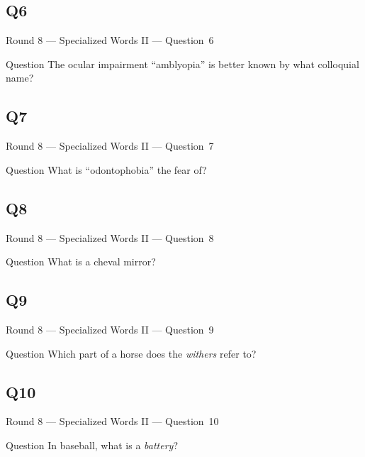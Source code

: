 \documentclass[11pt]{beamer}
\begin{document}
\subsection*{Q6}
\begin{frame}[t]{Round 8 --- Specialized Words II --- \mbox{Question 6}}
    \vspace{-0.5em}
    \begin{block}{Question}
        The ocular impairment ``amblyopia'' is better known by what colloquial name?
    \end{block}
\end{frame}
\subsection*{Q7}
\begin{frame}[t]{Round 8 --- Specialized Words II --- \mbox{Question 7}}
    \vspace{-0.5em}
    \begin{block}{Question}
        What is ``odontophobia'' the fear of?
    \end{block}
\end{frame}
\subsection*{Q8}
\begin{frame}[t]{Round 8 --- Specialized Words II --- \mbox{Question 8}}
    \vspace{-0.5em}
    \begin{block}{Question}
        What is a cheval mirror?
    \end{block}
\end{frame}
\subsection*{Q9}
\begin{frame}[t]{Round 8 --- Specialized Words II --- \mbox{Question 9}}
    \vspace{-0.5em}
    \begin{block}{Question}
        Which part of a horse does the \emph{withers} refer to?
    \end{block}
\end{frame}
\subsection*{Q10}
\begin{frame}[t]{Round 8 --- Specialized Words II --- \mbox{Question 10}}
    \vspace{-0.5em}
    \begin{block}{Question}
        In baseball, what is a \emph{battery}?
    \end{block}
\end{frame}
\end{document}
